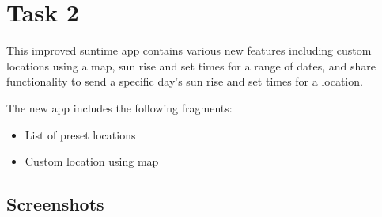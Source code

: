 \documentclass[11pt,english,numbers=endperiod,parskip=half]{scrartcl}
\begin{document}
\section{Task 2}
This improved suntime app contains various new features including custom locations
using a map, sun rise and set times for a range of dates, and share functionality
to send a specific day's sun rise and set times for a location.

The new app includes the following fragments:
\begin{itemize}
	\item{List of preset locations}
	\item{Custom location using map}
\end{itemize}

\subsection{Screenshots}
\setlength\fboxsep{0pt}
\setlength\fboxrule{0.5pt}

\begin{figure}[H]
\\
\end{figure}

\begin{figure}[H]
\\
\end{figure}
\end{document}
